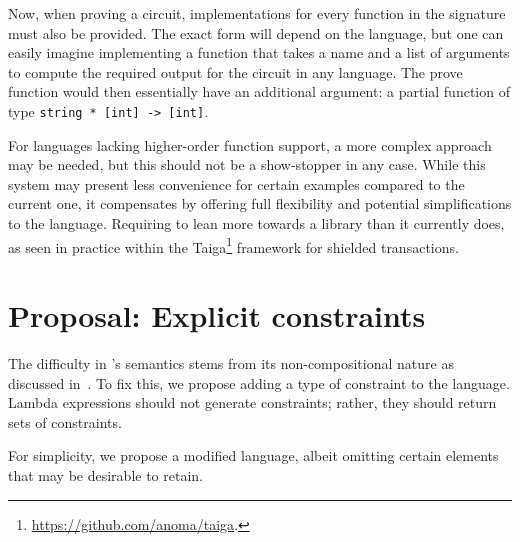 \documentclass[
    9pt,            
    techreport,       
    affiltop,       
]{art}
\begin{document}
Now, when proving a circuit, implementations for every function in the signature must also be provided. The exact form will depend on the language, but one can easily imagine implementing a function that takes a name and a list of arguments to compute the required output for the circuit in any language. The prove function would then essentially have an additional argument: a partial function of type \texttt{string * [int] -> [int]}.

For languages lacking higher-order function support, a more complex approach may be needed, but this should not be a show-stopper in any case. While this system may present less convenience for certain examples compared to the current one, it compensates by offering full flexibility and potential simplifications to the language. Requiring \VampIR{} to lean more towards a library than it currently does, as seen in practice within the Taiga\footnote{\url{https://github.com/anoma/taiga}.} framework for shielded transactions.

\section{Proposal: Explicit constraints}
\label{sec:explicit-constraints}

The difficulty in \VampIR{}'s semantics stems from its non-compositional nature as discussed in~. To fix this, we propose adding a type of constraint to the language. Lambda expressions should not generate constraints; rather, they should return sets of constraints.


For simplicity, we propose a modified language, albeit omitting certain elements that may be desirable to retain.
\end{document}
